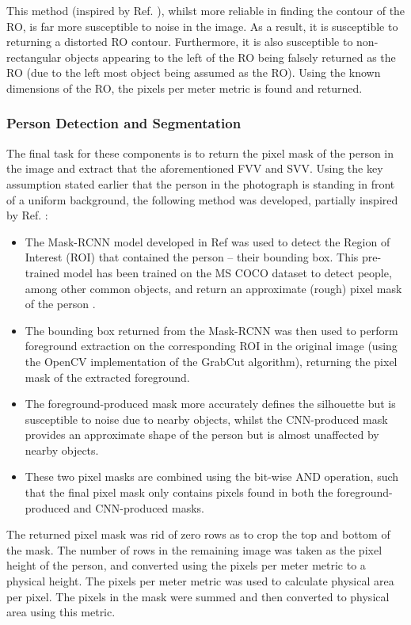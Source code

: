 \documentclass[conference]{IEEEtran}
\begin{document}
This method (inspired by Ref. \cite{objectDetection}), whilst more reliable in finding the contour of the RO, is far more susceptible to noise in the image.
As a result, it is susceptible to returning a distorted RO contour.
Furthermore, it is also susceptible to non-rectangular objects appearing to the left of the RO being falsely returned as the RO (due to the left most object being assumed as the RO).
Using the known dimensions of the RO, the pixels per meter metric is found and returned.

\subsubsection{Person Detection and Segmentation}
The final task for these components is to return the pixel mask of the person in the image and extract that the aforementioned FVV and SVV.
Using the key assumption stated earlier that the person in the photograph is standing in front of a uniform background, the following method was developed, partially inspired by Ref. \cite{maskrcnnDetection}:
\begin{itemize}
	\item The Mask-RCNN model developed in Ref \cite{maskrcnn} was used to detect the Region of Interest (ROI) that contained the person -- their bounding box.
	This pre-trained model has been trained on the MS COCO dataset to detect people, among other common objects, and return an approximate (rough) pixel mask of the person \cite{mscoco}.
	\item The bounding box returned from the Mask-RCNN was then used to perform foreground extraction on the corresponding ROI in the original image (using the OpenCV implementation of the GrabCut algorithm), returning the pixel mask of the extracted foreground.
	\item The foreground-produced mask more accurately defines the silhouette but is susceptible to noise due to nearby objects, whilst the CNN-produced mask provides an approximate shape of the person but is almost unaffected by nearby objects.
	\item These two pixel masks are combined using the bit-wise AND operation, such that the final pixel mask only contains pixels found in both the foreground-produced and CNN-produced masks.
\end{itemize}
The returned pixel mask was rid of zero rows as to crop the top and bottom of the mask.
The number of rows in the remaining image was taken as the pixel height of the person, and converted using the pixels per meter metric to a physical height.
The pixels per meter metric was used to calculate physical area per pixel.
The pixels in the mask were summed and then converted to physical area using this metric.
\end{document}
